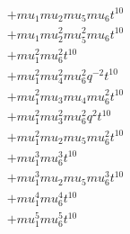 \begin{align*}
  + mu_1 mu_2 mu_5 mu_6 t^{10} \\
  + mu_1 mu_2^{2} mu_5^{2} mu_6 t^{10} \\
  + mu_1^{2} mu_6^{2} t^{10} \\
  + mu_1^{2} mu_4^{2} mu_6^{2} q^{-2} t^{10} \\
  + mu_1^{2} mu_3 mu_4 mu_6^{2} t^{10} \\
  + mu_1^{2} mu_3^{2} mu_6^{2} q^{2} t^{10} \\
  + mu_1^{2} mu_2 mu_5 mu_6^{2} t^{10} \\
  + mu_1^{3} mu_6^{3} t^{10} \\
  + mu_1^{3} mu_2 mu_5 mu_6^{3} t^{10} \\
  + mu_1^{4} mu_6^{4} t^{10} \\
  + mu_1^{5} mu_6^{5} t^{10}
\end{align*}
